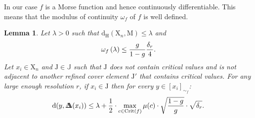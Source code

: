 \documentclass[pdflatex,sn-mathphys-ay]{sn-jnl}%
\newtheorem{lemma}[theorem]{Lemma}
\newcommand{\man}{\mathrm{M}}
\newcommand{\sample}{\mathrm{X}}
\newcommand{\dis}{\mathrm{d}}
\newcommand{\critic}{{\mathrm {Crit}}}
\newcommand{\haus}{{\mathrm {d_H}}}
\newcommand{\DD}{\Delta\!\!\!\!\Delta}
\newcommand{\coverwidth}{\change{\delta_r}}
\newcommand{\change}[1]{\noindent #1}
\theoremstyle{thmstyleone}%
\begin{document}
In our case $f$ is a Morse function and hence continuously differentiable. This means that the modulus of continuity $\omega_f$ of $f$ is well defined.

\begin{lemma}\label{lem:slice}
Let $\lambda>0$ such that $\haus(\sample_n,\man)\leq \lambda$ and
$$\omega_f\left(\lambda\right)\leq\frac{g}{1-g} \frac{\coverwidth}{4}.$$
Let $x_i\in\sample_n$ and $\mathrm{J}\in\mathbb{J}$ such that $\mathrm{J}$ does not contain critical values and is not adjacent to another refined cover element $\mathrm{J}'$ that contains critical values. For any large enough resolution $r$, if $x_i\in\mathrm{J}$ then for every $y\in[x_i]_{\sim_f}$:
$$\dis(y,\DD(x_i))\leq \lambda+\frac{1}{2}\cdot\max_{c\in\critic(f)}\mu(c)\cdot\sqrt{\frac{1-g}{g}}\cdot\sqrt{\coverwidth}.$$
\end{lemma}
\end{document}

